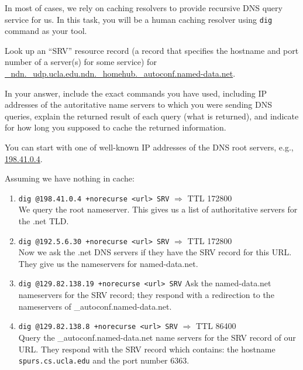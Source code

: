 \documentclass{report}
\begin{document}
\clearpage
\begin{problem}

In most of cases, we rely on caching resolvers to provide recursive DNS query
service for us. In this task, you will be a human caching resolver using
\verb|dig| command as your tool.

Look up an ``SRV'' resource record (a record that specifies the hostname and
port number of a server(s) for some service) for
\url{_ndn._udp.ucla.edu.ndn._homehub._autoconf.named-data.net}.

In your answer, include the exact commands you have used, including IP
addresses of the autoritative name servers to which you were sending DNS
queries, explain the returned result of each query (what is returned), and
indicate for how long you supposed to cache the returned information.

You can start with one of well-known IP addresses of the DNS root servers,
e.g., \url{198.41.0.4}.

\begin{answer}{30em}
  Assuming we have nothing in cache: \\
  \begin{enumerate}
  \item \texttt{dig @198.41.0.4 +norecurse <url> SRV} $\Rightarrow$ TTL 172800 \\
        We query the root nameserver. This gives us a list of authoritative
        servers for the .net TLD.

  \item \texttt{dig @192.5.6.30 +norecurse <url> SRV} $\Rightarrow$ TTL 172800 \\
        Now we ask the .net DNS servers if they have the SRV record for this
        URL. They give us the nameservers for named-data.net.

  \item \texttt{dig @129.82.138.19 +norecurse <url> SRV}
        Ask the named-data.net nameservers for the SRV record; they respond with
        a redirection to the nameservers of \_autoconf.named-data.net.

  \item \texttt{dig @129.82.138.8 +norecurse <url> SRV} $\Rightarrow$ TTL 86400 \\
        Query the \_autoconf.named-data.net name servers for the SRV record of our URL.
        They respond with the SRV record which contains: the hostname
        \texttt{spurs.cs.ucla.edu} and the port number 6363.
  \end{enumerate}
\end{answer}

\end{problem}
\end{document}
